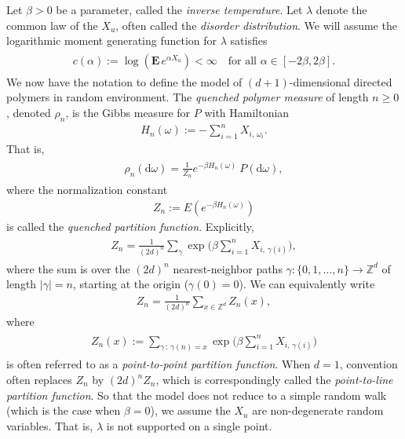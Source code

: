 \documentclass[11pt,reqno]{amsart}
\numberwithin{equation}{section}
\theoremstyle{definition}
\begin{document}
Let $\beta > 0$ be a parameter, called the \textit{inverse temperature}.
Let $\lambda$ denote the common law of the $X_u$, often called the \textit{disorder distribution}. 
We will assume the logarithmic moment generating function for $\lambda$ satisfies
{\begin{align} \begin{split} {
c(\alpha) := \log ({\mathbf{E}}\, e^{\alpha X_u}) < \infty \quad \text{for all $\alpha \in [-2\beta,2\beta]$}. \label{mgf}
} \end{split} \end{align}}
We now have the notation to define the model of $(d+1)$-dimensional directed polymers in random environment.
The \textit{quenched polymer measure} of length $n \geq 0$, denoted $\rho_n$, is the Gibbs measure for $P$ with Hamiltonian
{\begin{align*} {
H_n(\omega) := -\sum_{i = 1}^n X_{i,\, \omega_i}.
} \end{align*}}
That is,
{\begin{align} \begin{split} {
\rho_n({\mathrm{d}}\omega) = \frac{1}{Z_n}e^{-\beta H_n(\omega)}\ P({\mathrm{d}}\omega), \label{rho_def}
} \end{split} \end{align}}
where the normalization constant
{\begin{align*} {
Z_n := E(e^{-\beta H_n(\omega)})
} \end{align*}}
is called the \textit{quenched partition function}.
Explicitly,
{\begin{align} \begin{split} {
Z_n = \frac{1}{(2d)^n} \sum_{\gamma} \exp\bigg(\beta\sum_{i = 1}^n X_{i,\, \gamma(i)}\bigg), \label{Zn_def}
} \end{split} \end{align}}
where the sum is over the $(2d)^n$ nearest-neighbor paths $\gamma : \{0,1,\dots,n\} \to {\mathbb{Z}}^d$ of length $|\gamma| = n$, starting at the origin ($\gamma(0) = 0$).
We can equivalently write
{\begin{align*} {
Z_n = \frac{1}{(2d)^n} \sum_{x \in {\mathbb{Z}}^d} Z_n(x),
} \end{align*}}
where
{\begin{align} \begin{split} {
Z_n(x) := \sum_{\gamma\, :\, \gamma(n) = x} \exp\bigg(\beta\sum_{i = 1}^n X_{i,\, \gamma(i)}\bigg) \label{pointwise_Zn}
} \end{split} \end{align}}
is often referred to as a \textit{point-to-point partition function}.
When $d = 1$, convention often replaces $Z_n$ by $(2d)^n Z_n$, which is correspondingly called the \textit{point-to-line partition function}.
So that the model does not reduce to a simple random walk (which is the case when $\beta = 0$), we assume the $X_u$ are non-degenerate random variables.
That is, $\lambda$ is not supported on a single point.
\end{document}
